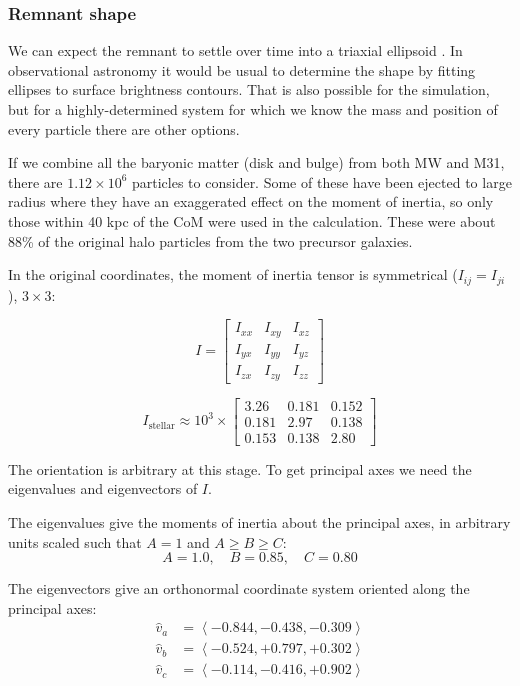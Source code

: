 \documentclass[twocolumn]{aastex63}
\newcommand{\todo}{\color{red}{TODO}\color{black}\hspace{2mm}}
\begin{document}
\subsubsection{Remnant shape}

\todo{boxiness?}

We can expect the remnant to settle over time into a triaxial ellipsoid \todo{ref?}. In observational astronomy it would be usual to determine the shape by fitting ellipses to surface brightness contours. That is also possible for the simulation, but for a highly-determined system for which we know the mass and position of every particle there are other options.

If we combine all the baryonic matter (disk and bulge) from both MW and M31, there are $1.12 \times 10^6$ particles to consider. Some of these have been ejected to large radius where they have an exaggerated effect on the moment of inertia, so only those within 40 kpc of the CoM were used in the calculation. These were about 88\% of the original halo particles from the two precursor galaxies.

In the original coordinates, the moment of inertia tensor is symmetrical ($I_{ij} = I_{ji}$), $3 \times 3$:

\[ I = \begin{bmatrix}
			I_{xx} & I_{xy} & I_{xz}\\
			I_{yx} & I_{yy} & I_{yz}\\
			I_{zx} & I_{zy} & I_{zz} 
		\end{bmatrix} \]
		
\[  I_{\text{stellar}} \approx 10^3 \times \begin{bmatrix}
		3.26 & 0.181 & 0.152\\
		0.181 & 2.97 & 0.138\\
		0.153 & 0.138 & 2.80
	\end{bmatrix} \] %
		
The orientation is arbitrary at this stage. To get principal axes we need the eigenvalues and eigenvectors of $I$. 

The eigenvalues give the moments of inertia about the principal axes, in arbitrary units scaled such that $A=1$ and $A \ge B \ge C$:
\[ A=1.0,\quad B= 0.85,\quad C=0.80 \]

The eigenvectors give an orthonormal coordinate system oriented along the principal axes:
\begin{align*}
	\hat{v}_a &= \left< -0.844, -0.438, -0.309 \right> \\
	\hat{v}_b &= \left< -0.524, +0.797,  +0.302 \right> \\
	\hat{v}_c &= \left< -0.114, -0.416 , +0.902 \right>
\end{align*}
\end{document}
